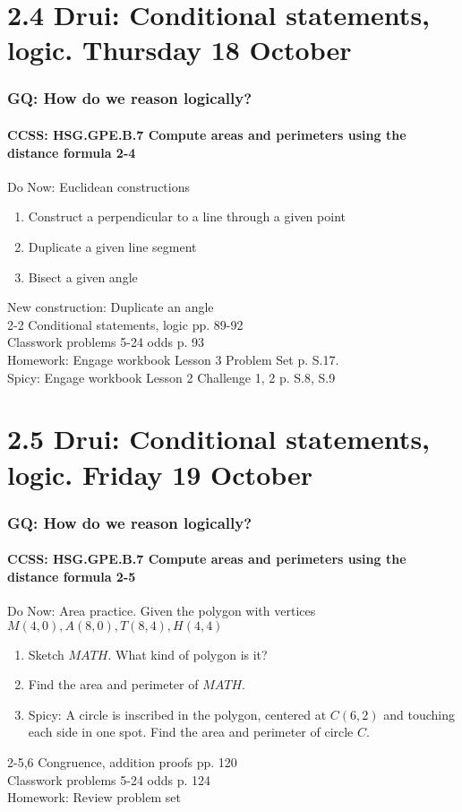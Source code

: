 \documentclass{beamer}
\begin{document}
\section{2.4 Drui: Conditional statements, logic. Thursday 18 October}
  \frame
  {
    \frametitle{GQ: How do we reason logically?}
    \framesubtitle{CCSS: HSG.GPE.B.7 Compute areas and perimeters using the distance formula  \alert{2-4}}

    \begin{block}{Do Now: Euclidean constructions}
    \begin{enumerate}
        \item Construct a perpendicular to a line through a given point
        \item Duplicate a given line segment
        \item Bisect a given angle
    \end{enumerate}
    \end{block}
    New construction: Duplicate an angle\\
    2-2 Conditional statements, logic  pp. 89-92\\
    Classwork problems 5-24 odds p. 93\\
    \vspace{0.5cm}
    Homework: Engage workbook Lesson 3 Problem Set p. S.17. \\
    Spicy: Engage workbook Lesson 2 Challenge 1, 2 p. S.8, S.9
  }

\section{2.5 Drui: Conditional statements, logic. Friday 19 October}
  \frame
  {
    \frametitle{GQ: How do we reason logically?}
    \framesubtitle{CCSS: HSG.GPE.B.7 Compute areas and perimeters using the distance formula  \alert{2-5}}

    \begin{block}{Do Now: Area practice. Given the polygon with vertices $M(4,0), A(8,0), T(8,4), H(4,4)$}
    \begin{enumerate}
        \item Sketch $MATH$. What kind of polygon is it?
        \item Find the area and perimeter of $MATH$.
        \item Spicy: A circle is inscribed in the polygon, centered at $C(6,2)$ and touching each side in one spot. Find the area and perimeter of circle $C$.
    \end{enumerate}
    \end{block}
    2-5,6 Congruence, addition proofs  pp. 120\\
    Classwork problems 5-24 odds p. 124\\
    \vspace{0.5cm}
    Homework: Review problem set
  }
\end{document}
